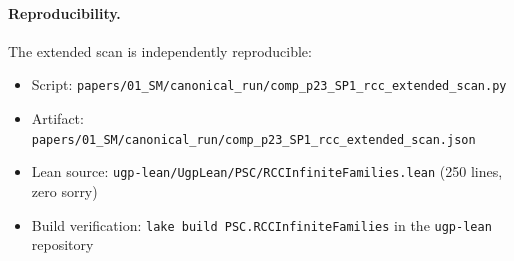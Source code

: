 \documentclass[11pt]{article}
\theoremstyle{remark}
\begin{document}
\paragraph{Reproducibility.}
The extended scan is independently reproducible:
\begin{itemize}[leftmargin=1.5em,itemsep=1pt]
  \item Script: \texttt{papers/01\_SM/canonical\_run/comp\_p23\_SP1\_rcc\_extended\_scan.py}
  \item Artifact: \texttt{papers/01\_SM/canonical\_run/comp\_p23\_SP1\_rcc\_extended\_scan.json}
  \item Lean source: \texttt{ugp-lean/UgpLean/PSC/RCCInfiniteFamilies.lean} (250 lines, zero sorry)
  \item Build verification: \texttt{lake build PSC.RCCInfiniteFamilies} in the \texttt{ugp-lean} repository
\end{itemize}
\end{document}
